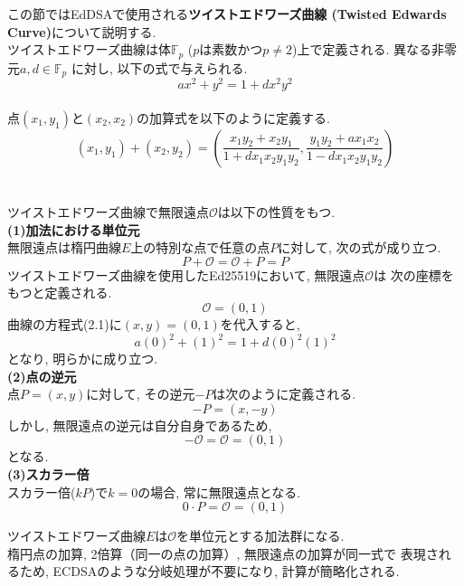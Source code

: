 この節ではEdDSAで使用される\textbf{ツイストエドワーズ曲線
(Twisted Edwards Curve)}について説明する.\\
\indent ツイストエドワーズ曲線は体$\mathbb{F}_p$ ($p$は素数かつ$p\neq 2$)上で定義される.
異なる非零元$a,d\in \mathbb{F}_p$ に対し, 以下の式で与えられる.
\begin{equation}
  ax^2 + y^2 = 1 + dx^2y^2
\end{equation}
\\
\indent 点$(x_1,y_1)$と$(x_2,x_2)$の加算式を以下のように定義する.
\begin{equation}
  (x_1,y_1)+(x_2,y_2)=
  \left( 
    \frac{x_1y_2+x_2y_1}{1+dx_1x_2y_1y_2},
    \frac{y_1y_2+ax_1x_2}{1-dx_1x_2y_1y_2} 
  \right)
\end{equation} \\[1em]
\\
\indent ツイストエドワーズ曲線で無限遠点$\mathcal{O}$は以下の性質をもつ.\\[0.5em]
\noindent\textbf{(1)加法における単位元}\\
\indent 無限遠点は楕円曲線$E$上の特別な点で任意の点$P$に対して, 次の式が成り立つ.
\begin{equation}
  P+\mathcal{O}=\mathcal{O}+P=P
\end{equation}
\indent ツイストエドワーズ曲線を使用したEd25519において, 無限遠点$\mathcal{O}$は
次の座標をもつと定義される.
\begin{equation}
  \mathcal{O}=(0,1)
\end{equation}
\indent 曲線の方程式(2.1)に$(x,y)=(0,1)$を代入すると,
\begin{equation}
  a(0)^2 + (1)^2 = 1 + d(0)^2(1)^2
\end{equation}
となり, 明らかに成り立つ.\\[1em]
\noindent \textbf{(2)点の逆元}\\
\indent 点$P=(x,y)$に対して, その逆元$-P$は次のように定義される.
\begin{equation}
  -P=(x,-y)
\end{equation}
\indent しかし, 無限遠点の逆元は自分自身であるため, 
\begin{equation}
  -\mathcal{O}=\mathcal{O}=(0,1)
\end{equation}
となる.\\
\noindent \textbf{(3)スカラー倍}\\
\indent スカラー倍($kP$)で$k=0$の場合, 常に無限遠点となる.
\begin{equation}
  0\cdot P=\mathcal{O}=(0,1)
\end{equation}

\indent ツイストエドワーズ曲線$E$は$\mathcal{O}$を単位元とする加法群になる.\\
楕円点の加算, 2倍算（同一の点の加算）, 無限遠点の加算が同一式で
表現されるため, ECDSAのような分岐処理が不要になり, 計算が簡略化される.\\




